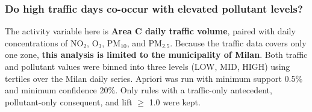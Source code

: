 \documentclass{article}
\begin{document}
	\subsubsection{Do high traffic days co-occur with elevated pollutant levels?}

	The activity variable here is \textbf{Area C daily traffic volume}, paired with daily concentrations of NO$_2$, O$_3$, PM$_{10}$, and PM$_{2.5}$.
	Because the traffic data covers only one zone, \textbf{this analysis is limited to the municipality of Milan}.
	Both traffic and pollutant values were binned into three levels (LOW, MID, HIGH) using tertiles over the Milan daily series.
	Apriori was run with minimum support 0.5\% and minimum confidence 20\%. 
	Only rules with a traffic-only antecedent, pollutant-only consequent, and lift $\geq$ 1.0 were kept.
\end{document}
